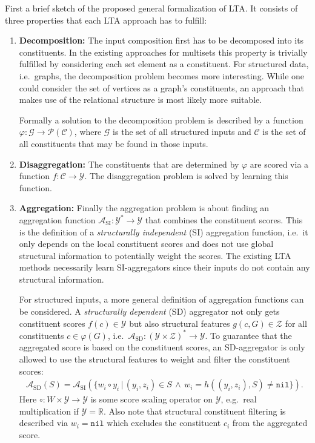 \documentclass[12pt]{scrartcl}
\begin{document}
First a brief sketch of the proposed general formalization of LTA.\@
It consists of three properties that each LTA approach has to fulfill:
\begin{enumerate}[label=\textbf{\arabic*.}]
	\item \textbf{Decomposition:}
		The input composition first has to be decomposed into its constituents.
		In the existing approaches for multisets this property is trivially fulfilled by considering each set element as a constituent.
		For structured data, i.e.\ graphs, the decomposition problem becomes more interesting.
		While one could consider the set of vertices as a graph's constituents, an approach that makes use of the relational structure is most likely more suitable.

		Formally a solution to the decomposition problem is described by a function $\varphi: \mathcal{G} \to \mathcal{P}(\mathcal{C})$, where $\mathcal{G}$ is the set of all structured inputs and $\mathcal{C}$ is the set of all constituents that may be found in those inputs.
	\item \textbf{Disaggregation:}
		The constituents that are determined by $\varphi$ are scored via a function $f: \mathcal{C} \to \mathcal{Y}$.
		The disaggregation problem is solved by learning this function.
	\item \textbf{Aggregation:}
		Finally the aggregation problem is about finding an aggregation function $\mathcal{A}_{\text{SI}}: \mathcal{Y}^* \to \mathcal{Y}$ that combines the constituent scores.
		This is the definition of a \textit{structurally independent} (SI) aggregation function, i.e.\ it only depends on the local constituent scores and does not use global structural information to potentially weight the scores.
		The existing LTA methods necessarily learn SI-aggregators since their inputs do not contain any structural information.

		For structured inputs, a more general definition of aggregation functions can be considered.
		A \textit{structurally dependent} (SD) aggregator not only gets constituent scores $f(c) \in \mathcal{Y}$ but also structural features $g(c, G) \in \mathcal{Z}$ for all constituents $c \in \varphi(G)$, i.e.\ $\mathcal{A}_{\text{SD}}: {(\mathcal{Y} \times \mathcal{Z})}^* \to \mathcal{Y}$.
		To guarantee that the aggregated score is based on the constituent scores, an SD-aggregator is only allowed to use the structural features to weight and filter the constituent scores:
		\begin{align}
			\mathcal{A}_{\text{SD}}(S)
			= \mathcal{A}_{\text{SI}}(\{ w_i \circ y_i \,|\, (y_i, z_i) \in S \,\land\, w_i = h((y_i, z_i), S) \neq \texttt{nil} \}) \text{.} %
		\end{align}
		Here $\circ: W \times \mathcal{Y} \to \mathcal{Y}$ is some score scaling operator on $\mathcal{Y}$, e.g.\ real multiplication if $\mathcal{Y} = \mathbb{R}$.
		Also note that structural constituent filtering is described via $w_i = \texttt{nil}$ which excludes the constituent $c_i$ from the aggregated score.
\end{enumerate}
\end{document}
